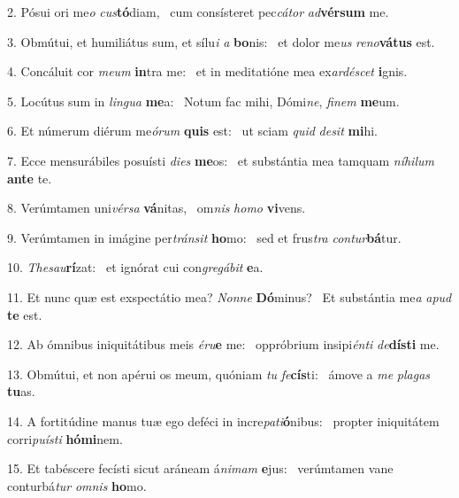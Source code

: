 2. Pósui ori me\textit{o} \textit{cus}\textbf{tó}diam, \ast\  cum consísteret pec\textit{cá}\textit{tor} \textit{ad}\textbf{vér}\textbf{sum} me.\

3. Obmútui, et humiliátus sum, et sílu\textit{i} \textit{a} \textbf{bo}nis: \ast\  et dolor me\textit{us} \textit{re}\textit{no}\textbf{vá}\textbf{tus} est.\

4. Concáluit cor \textit{me}\textit{um} \textbf{in}tra me: \ast\  et in meditatióne mea ex\textit{ar}\textit{dé}\textit{scet} \textbf{i}gnis.\

5. Locútus sum in \textit{lin}\textit{gua} \textbf{me}a: \ast\  Notum fac mihi, Dómi\textit{ne}, \textit{fi}\textit{nem} \textbf{me}um.\

6. Et númerum diérum me\textit{ó}\textit{rum} \textbf{quis} est: \ast\  ut sciam \textit{quid} \textit{de}\textit{sit} \textbf{mi}hi.\

7. Ecce mensurábiles posuísti \textit{di}\textit{es} \textbf{me}os: \ast\  et substántia mea tamquam \textit{ní}\textit{hi}\textit{lum} \textbf{an}\textbf{te} te.\

8. Verúmtamen uni\textit{vér}\textit{sa} \textbf{vá}nitas, \ast\  om\textit{nis} \textit{ho}\textit{mo} \textbf{vi}vens.\

9. Verúmtamen in imágine per\textit{tráns}\textit{it} \textbf{ho}mo: \ast\  sed et frus\textit{tra} \textit{con}\textit{tur}\textbf{bá}tur.\

10. \textit{The}\textit{sau}\textbf{rí}zat: \ast\  et ignórat cui con\textit{gre}\textit{gá}\textit{bit} \textbf{e}a.\

11. Et nunc quæ est exspectátio mea? \textit{Non}\textit{ne} \textbf{Dó}minus? \ast\  Et substántia me\textit{a} \textit{a}\textit{pud} \textbf{te} est.\

12. Ab ómnibus iniquitátibus meis \textit{é}\textit{ru}\textbf{e} me: \ast\  oppróbrium insipi\textit{én}\textit{ti} \textit{de}\textbf{dís}\textbf{ti} me.\

13. Obmútui, et non apérui os meum, quóniam \textit{tu} \textit{fe}\textbf{cís}ti: \ast\  ámove a \textit{me} \textit{pla}\textit{gas} \textbf{tu}as.\

14. A fortitúdine manus tuæ ego deféci in incre\textit{pa}\textit{ti}\textbf{ó}nibus: \ast\  propter iniquitátem corri\textit{pu}\textit{ís}\textit{ti} \textbf{hó}\textbf{mi}nem.\

15. Et tabéscere fecísti sicut aráneam á\textit{ni}\textit{mam} \textbf{e}jus: \ast\  verúmtamen vane conturbá\textit{tur} \textit{om}\textit{nis} \textbf{ho}mo.\

